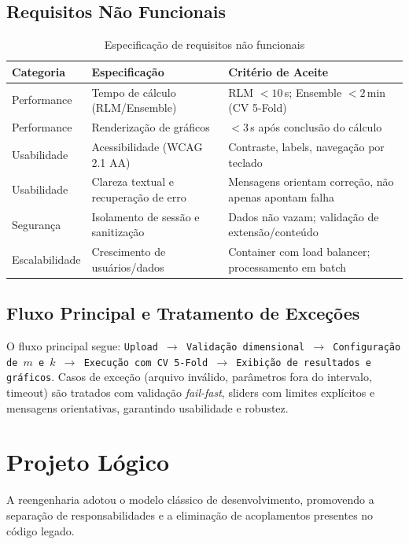 \documentclass[12pt,a4paper]{article}
\begin{document}
\subsection{Requisitos Não Funcionais}
\begin{table}[H]
\centering
\caption{Especificação de requisitos não funcionais}
\begin{tabularx}{\textwidth}{l X X}
\toprule
\textbf{Categoria} & \textbf{Especificação} & \textbf{Critério de Aceite} \\
\midrule
Performance & Tempo de cálculo (RLM/Ensemble) & RLM $< 10\,$s; Ensemble $< 2\,$min (CV 5-Fold) \\
Performance & Renderização de gráficos & $< 3\,$s após conclusão do cálculo \\
Usabilidade & Acessibilidade (WCAG 2.1 AA) & Contraste, labels, navegação por teclado \\
Usabilidade & Clareza textual e recuperação de erro & Mensagens orientam correção, não apenas apontam falha \\
Segurança & Isolamento de sessão e sanitização & Dados não vazam; validação de extensão/conteúdo \\
Escalabilidade & Crescimento de usuários/dados & Container com load balancer; processamento em batch \\
\bottomrule
\end{tabularx}
\end{table}

\subsection{Fluxo Principal e Tratamento de Exceções}
O fluxo principal segue: \texttt{Upload $\rightarrow$ Validação dimensional $\rightarrow$ Configuração de $m$ e $k$ $\rightarrow$ Execução com CV 5-Fold $\rightarrow$ Exibição de resultados e gráficos}. Casos de exceção (arquivo inválido, parâmetros fora do intervalo, timeout) são tratados com validação \textit{fail-fast}, sliders com limites explícitos e mensagens orientativas, garantindo usabilidade e robustez.

\section{Projeto Lógico}

A reengenharia adotou o modelo clássico de desenvolvimento, promovendo a separação de responsabilidades e a eliminação de acoplamentos presentes no código legado.
\end{document}
